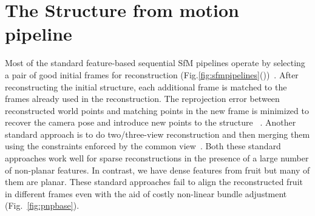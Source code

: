 \section{The Structure from motion pipeline}\label{sfm}

Most of the standard feature-based sequential SfM pipelines operate by selecting a pair of good initial frames for reconstruction (Fig.\ref{fig:sfmpipelines}())~\cite{scaramuzza2011visual}. After reconstructing the initial structure, each additional frame is matched to the frames already used in the reconstruction. The reprojection error between reconstructed world points and matching points in the new frame is minimized to recover the camera pose and introduce new points to the structure ~\cite{pnp}. Another standard approach is to do two/three-view reconstruction and then merging them using the constraints enforced by the common view~\cite{sinha2014multi}. Both these standard approaches work well for sparse reconstructions in the presence of a large number of non-planar features. In contrast, we have dense features from fruit but many of them are planar. These standard approaches fail to align the reconstructed fruit in different frames even with the aid of costly non-linear bundle adjustment (Fig.~\ref{fig:pnpbase}).


